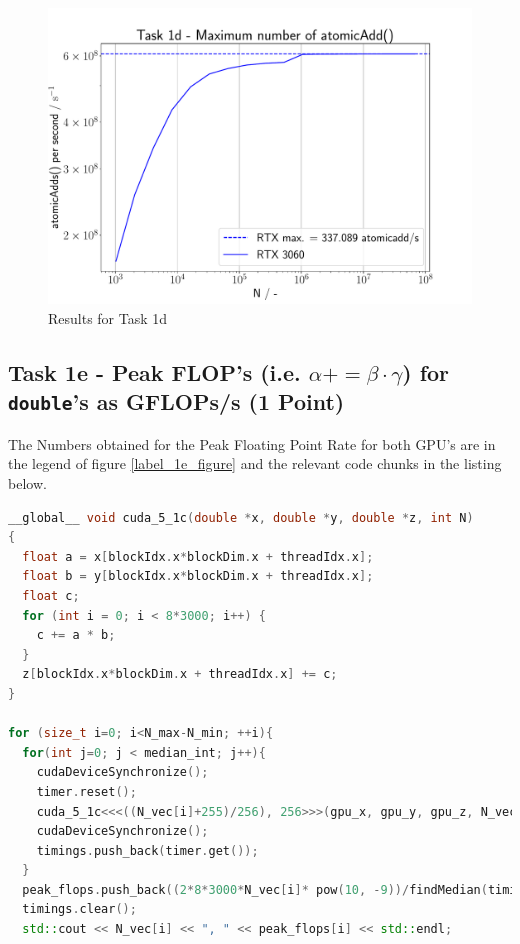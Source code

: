 \begin{figure}[h]
  \begin{center}
    \includegraphics[width= 0.8\linewidth]{figures/task_1_d.pdf}
    \caption{Results for Task 1d}
    \label{label_1d_figure}
  \end{center}
\end{figure}



\pagebreak

\subsection{Task 1e - Peak FLOP's (i.e. $\alpha += \beta \cdot \gamma$) for \texttt{double}'s as GFLOPs/s (1 Point)}
The Numbers obtained for the Peak Floating Point Rate for both GPU's are in the legend of figure \ref{label_1e_figure} and the relevant
code chunks in the listing below.

\begin{lstlisting}[language=C++, title=C++ Cuda Code Maximal Floating Point Rate]
__global__ void cuda_5_1c(double *x, double *y, double *z, int N)
{
  float a = x[blockIdx.x*blockDim.x + threadIdx.x];
  float b = y[blockIdx.x*blockDim.x + threadIdx.x];
  float c;
  for (int i = 0; i < 8*3000; i++) {
    c += a * b;
  }
  z[blockIdx.x*blockDim.x + threadIdx.x] += c;
}

for (size_t i=0; i<N_max-N_min; ++i){
  for(int j=0; j < median_int; j++){
    cudaDeviceSynchronize();
    timer.reset();
    cuda_5_1c<<<((N_vec[i]+255)/256), 256>>>(gpu_x, gpu_y, gpu_z, N_vec[i]);
    cudaDeviceSynchronize();
    timings.push_back(timer.get());
  }
  peak_flops.push_back((2*8*3000*N_vec[i]* pow(10, -9))/findMedian(timings, median_int));
  timings.clear();
  std::cout << N_vec[i] << ", " << peak_flops[i] << std::endl;
\end{lstlisting}

